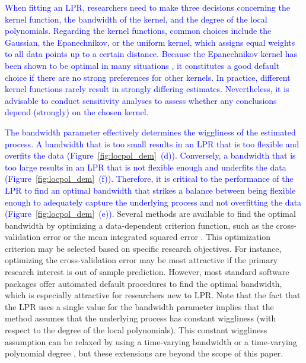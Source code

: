 \documentclass[man, floatsintext]{apa7}
\begin{document}
\textcolor{blue}{
  When fitting an LPR, researchers need to make three decisions concerning the
  kernel function, the bandwidth of the kernel, and the degree of the local
  polynomials. Regarding the kernel functions, common choices include the
  Gaussian, the Epanechnikov, or the uniform kernel, which assigns equal
  weights to all data points up to a certain distance. Because the Epanechnikov
  kernel has been shown to be optimal in many situations
  \parencite{fan_local_1997}, it constitutes a good default choice if there are
  no strong preferences for other kernels. In practice, different kernel
  functions rarely result in strongly differing estimates. Nevertheless, it is
  advisable to conduct sensitivity analyses to assess whether any conclusions
  depend (strongly) on the chosen kernel.
}

\textcolor{blue}{
  The bandwidth parameter effectively determines the wiggliness of the
  estimated process. A bandwidth that is too small results in an LPR that is
  too flexible and overfits the data (Figure~\ref{fig:locpol_dem}~(d)).
  Conversely, a bandwidth that is too large results in an LPR that is not
  flexible enough and underfits the data (Figure~\ref{fig:locpol_dem}~(f)).
  Therefore, it is critical to the performance of the LPR to find an optimal
  bandwidth that strikes a balance between being flexible enough to adequately
  capture the underlying process and not overfitting the data
  (Figure~\ref{fig:locpol_dem}~(e)).} Several methods are available to find
the
optimal bandwidth by optimizing a data-dependent criterion function, such as
the cross-validation error or the mean integrated squared error
\parencite{kohler_review_2014, debruyne_model_2008}. This optimization
criterion may be selected based on specific research objectives. For instance,
optimizing the cross-validation error may be most attractive if the primary
research interest is out of sample prediction. However, most standard software
packages offer automated default procedures to find the optimal bandwidth,
which is especially attractive for researchers new to LPR\@. Note that the fact
that the LPR uses a single value for the bandwidth parameter implies that the
method assumes that the underlying process has constant wiggliness (with
respect to the degree of the local polynomials). This
constant wiggliness assumption can be relaxed by using a time-varying bandwidth
\parencite{fan_data-driven_1995} or a time-varying polynomial degree
\parencite{fan_adaptive_1995}, but these extensions are beyond the scope of
this paper.
\end{document}
